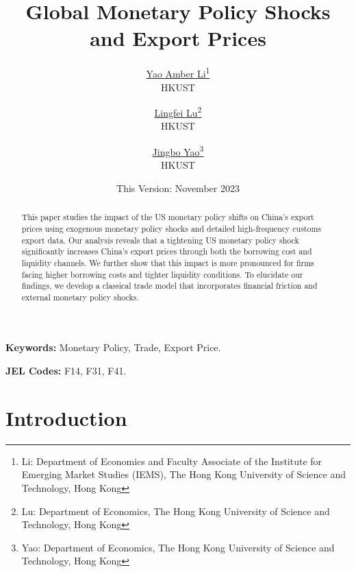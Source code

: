 

\linespread{1.2}
\geometry{a4paper,scale=0.75}
\setlength{\parskip}{0.5em}




\title{\Large \textbf{Global Monetary Policy Shocks and Export Prices}}

\author{\large \href{http://yaoli.people.ust.hk/}{Yao Amber Li}\thanks{Li: Department of Economics and Faculty Associate of the Institute for Emerging Market Studies (IEMS), The Hong Kong University of Science and Technology, Hong Kong}\\ \large{HKUST}
\medskip
\and \href{}{Lingfei Lu}\thanks{Lu: Department of Economics, The Hong Kong University of Science and Technology, Hong Kong } \\ \large{HKUST}
\medskip
\and \href{}{Jingbo Yao}\thanks{Yao: Department of Economics, The Hong Kong University of Science and Technology, Hong Kong} \\ \large{HKUST}
}
\date{This Version: November 2023}

\maketitle

\begin{abstract}
This paper studies the impact of the US monetary policy shifts on China's export prices using exogenous monetary policy shocks and detailed high-frequency customs export data. Our analysis reveals that a tightening US monetary policy shock significantly increases China's export prices through both the borrowing cost and liquidity channels. We further show that this impact is more pronounced for firms facing higher borrowing costs and tighter liquidity conditions. To elucidate our findings, we develop a classical trade model that incorporates financial friction and external monetary policy shocks.

\end{abstract}

\textbf{Keywords:} Monetary Policy, Trade, Export Price.

\textbf{JEL Codes:} F14, F31, F41.
\newpage

\tableofcontents

\newpage
\section{Introduction}

